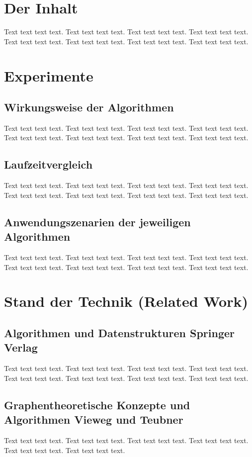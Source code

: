 \documentclass[a4paper]{llncs}
\begin{document}
\section{Der Inhalt}
\label{Inhalt}
Text text text text. Text text text text. Text text text text. Text text text text. Text text text text. Text text text text. Text text text text. Text text text text.

\section{Experimente}
\label{Experimente}

\subsection{Wirkungsweise der Algorithmen}
Text text text text. Text text text text. Text text text text. Text text text text. Text text text text. Text text text text. Text text text text. Text text text text. 

\subsection{Laufzeitvergleich}
Text text text text. Text text text text. Text text text text. Text text text text. Text text text text. Text text text text. Text text text text. Text text text text. 

\subsection{Anwendungszenarien der jeweiligen Algorithmen}
Text text text text. Text text text text. Text text text text. Text text text text. Text text text text. Text text text text. Text text text text. Text text text text. 

\section{Stand der Technik (Related Work)}
\label{Related Work}
\subsection{Algorithmen und Datenstrukturen Springer Verlag}
Text text text text. Text text text text. Text text text text. Text text text text. Text text text text. Text text text text. Text text text text. Text text text text. 
\subsection{Graphentheoretische Konzepte und Algorithmen Vieweg und Teubner}
Text text text text. Text text text text. Text text text text. Text text text text. Text text text text. Text text text text. 
\end{document}
